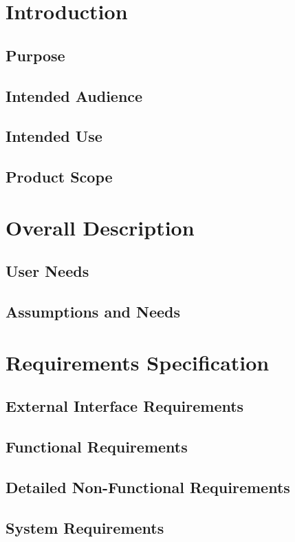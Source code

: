 \documentclass[12pt]{report}
\begin{document}
\tableofcontents
\newpage

\chapter{Introduction}
\section{Purpose}

\section{Intended Audience}

\section{Intended Use}

\section{Product Scope}


\chapter{Overall Description}
\section{User Needs}

\section{Assumptions and Needs}


\chapter{Requirements Specification}
\section{External Interface Requirements}

\section{Functional Requirements}

\section{Detailed Non-Functional Requirements}

\section{System Requirements}

\end{document}
